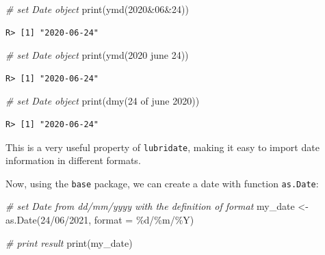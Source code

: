 \documentclass[
  12pt,
]{book}
\newenvironment{Shaded}{\begin{snugshade}}{\end{snugshade}}
\newcommand{\AttributeTok}[1]{\textcolor[rgb]{0.61,0.61,0.61}{#1}}
\newcommand{\CommentTok}[1]{\textcolor[rgb]{0.37,0.37,0.37}{\textit{#1}}}
\newcommand{\FunctionTok}[1]{\textcolor[rgb]{0,0,0}{#1}}
\newcommand{\NormalTok}[1]{#1}
\newcommand{\OtherTok}[1]{\textcolor[rgb]{0.37,0.37,0.37}{#1}}
\newcommand{\StringTok}[1]{\textcolor[rgb]{0.5,0.5,0.5}{#1}}
\begin{document}
\begin{Shaded}
\begin{Highlighting}[]
\CommentTok{\# set Date object }
\FunctionTok{print}\NormalTok{(}\FunctionTok{ymd}\NormalTok{(}\StringTok{\textquotesingle{}2020\&06\&24\textquotesingle{}}\NormalTok{))}
\end{Highlighting}
\end{Shaded}

\begin{verbatim}
R> [1] "2020-06-24"
\end{verbatim}

\begin{Shaded}
\begin{Highlighting}[]
\CommentTok{\# set Date object}
\FunctionTok{print}\NormalTok{(}\FunctionTok{ymd}\NormalTok{(}\StringTok{\textquotesingle{}2020 june 24\textquotesingle{}}\NormalTok{))}
\end{Highlighting}
\end{Shaded}

\begin{verbatim}
R> [1] "2020-06-24"
\end{verbatim}

\begin{Shaded}
\begin{Highlighting}[]
\CommentTok{\# set Date object}
\FunctionTok{print}\NormalTok{(}\FunctionTok{dmy}\NormalTok{(}\StringTok{\textquotesingle{}24 of june 2020\textquotesingle{}}\NormalTok{))}
\end{Highlighting}
\end{Shaded}

\begin{verbatim}
R> [1] "2020-06-24"
\end{verbatim}

This is a very useful property of \texttt{lubridate}, making it easy to import date information in different formats.

Now, using the \texttt{base} package, we can create a date with function \texttt{as.Date}:  

\begin{Shaded}
\begin{Highlighting}[]
\CommentTok{\# set Date from dd/mm/yyyy with the definition of format}
\NormalTok{my\_date }\OtherTok{\textless{}{-}} \FunctionTok{as.Date}\NormalTok{(}\StringTok{\textquotesingle{}24/06/2021\textquotesingle{}}\NormalTok{, }\AttributeTok{format =} \StringTok{\textquotesingle{}\%d/\%m/\%Y\textquotesingle{}}\NormalTok{)}

\CommentTok{\# print result}
\FunctionTok{print}\NormalTok{(my\_date)}
\end{Highlighting}
\end{Shaded}
\end{document}
